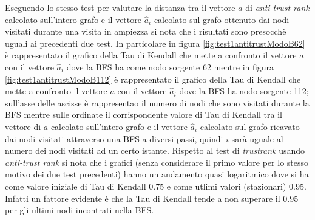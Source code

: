 Eseguendo lo stesso test per valutare la distanza tra il vettore \(a\) di \textit{anti-trust rank} calcolato sull'intero grafo e il vettore \(\hat{a}_i\) calcolato sul grafo ottenuto dai nodi visitati durante una visita in ampiezza si nota che i risultati sono presocchè uguali ai precedenti due test. In particolare in figura \ref{fig:test1antitrustModoB62} è rappresentato il grafico della Tau di Kendall che mette a confronto il vettore \(a\) con il vettore \(\hat{a}_i\) dove la BFS ha come nodo sorgente 62 mentre in figura \ref{fig:test1antitrustModoB112} è rappresentato il grafico della Tau di Kendall che mette a confronto il vettore \(a\) con il vettore \(\hat{a}_i\) dove la BFS ha nodo sorgente 112; sull'asse delle ascisse è rappresentao il numero di nodi che sono visitati durante la BFS mentre sulle ordinate il corrispondente valore di Tau di Kendall tra il vettore di \(a\) calcolato sull'intero grafo e il vettore \(\hat{a}_i\) calcolato sul grafo ricavato dai nodi visitati attraverso una BFS a diversi 
passi, quindi \(i\) sarà uguale al numero dei nodi visitati ad un certo istante. Rispetto al test di \textit{trustrank} usando \textit{anti-trust rank} si nota che i grafici (senza considerare il primo valore per lo stesso motivo dei due test precedenti) hanno un andamento quasi logaritmico dove si ha come valore iniziale di Tau di Kendall 0.75 e come utlimi valori (stazionari) 0.95. Infatti un fattore evidente è che la Tau di Kendall tende a non superare il 0.95 per gli ultimi nodi incontrati nella BFS.

